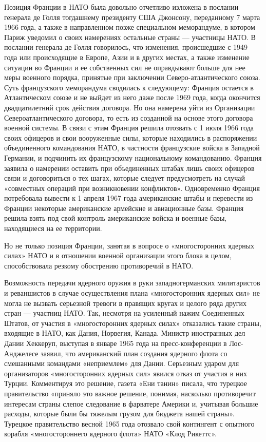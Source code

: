 \documentclass[12pt, a4paper, openany]{book}
\begin{document}
		Позиция Франции в НАТО была довольно отчетливо изложена в послании генерала де Голля тогдашнему президенту США Джонсону, переданному 7 марта 1966 года, а также в направленном позже специальном меморандуме, в котором Париж уведомил о своих намерениях остальные страны — участницы НАТО. В послании генерала де Голля говорилось, что изменения, происшедшие с 1949 года или происходящие в Европе, Азии и в других местах, а также изменение ситуации во Франции и ее собственных сил не оправдывают больше для нее меры военного порядка, принятые при заключении Северо-атлантического союза. Суть французского меморандума сводилась к следующему: Франция остается в Атлантическом союзе и не выйдет из него даже после 1969 года, когда окончится двадцатилетний срок действия договора. Но она намерена уйти из Организации Североатлантического договора, то есть из созданной на основе этого договора военной системы. В связи с этим Франция решила отозвать с 1 июля 1966 года своих офицеров и свои вооруженные силы, которые находились в распоряжении объединенного командования НАТО, в частности французские войска в Западной Германии, и подчинить их французскому национальному командованию. Франция заявила о намерении оставить при объединенных штабах лишь своих офицеров связи и договориться о тех шагах, которые следует предусмотреть на случай «совместных операций при возникновении конфликтов». Одновременно Франция потребовала вывести к 1 апреля 1967 года американские штабы и перевести из Франции некоторые американские армейские и авиационные базы. Франция решила взять под свой контроль американские войска и военные базы, находящиеся на ее территории.
		
		Но не только позиция Франции, занятая в вопросе о «многосторонних ядерных силах» НАТО и в отношении военной организации этого блока в целом, способствовала резкому обострению противоречий в НАТО.
		
		Возможность передачи ядерного оружия в руки западногерманских милитаристов и реваншистов в случае осуществления плана «многосторонних ядерных сил» не могла не вызвать серьезной тревоги в правящих кругах и целого ряда других стран — участниц НАТО. Так, несмотря на усиленный нажим Соединенных Штатов, от участия в «многосторонних ядерных силах» отказались такие страны, входящие в НАТО, как Дания, Норвегия, Канада. Министр иностранных дел Дании Хеккеруп, выступая в январе 1965 года на пресс-конференции в Лос-Анджелесе заявил, что американский план создания ядерного флота со смешанными командами «неприемлем» для Дании. Серьезным ударом для организаторов «многосторонних ядерных сил» явился отказ от участия в них Турции. Комментируя это решение, газета «Ени танин» писала, что турецкое правительство «приняло это важное решение, понимая, насколько противоречит интересам страны слепое следование в фарватере Америки и, учитывая большие расходы, которые были бы тяжелым грузом для бюджета нашей страны». Турецкое правительство весной 1965 года отозвало свой контингент с опытного корабля «многостороннего ядерного флота» НАТО «Клод Рикеттс».
		
\end{document}
